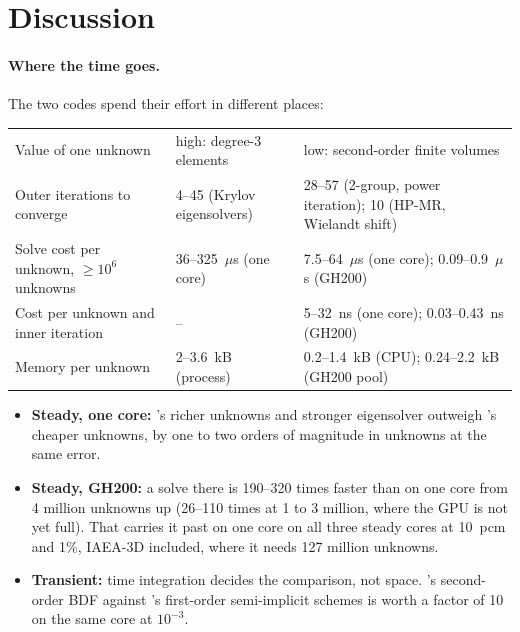 \section{Discussion}
\label{sec:discussion}

\paragraph{Where the time goes.} The two codes spend their effort in
different places:

\begin{center}\small
\begin{tabular}{p{4.0cm}p{5.0cm}p{5.9cm}}
\hline
 & \ffn{} & \garnet{} \\
\hline
Value of one unknown & high: degree-3 elements & low: second-order finite volumes \\
Outer iterations to converge & 4--45 (Krylov eigensolvers) & 28--57 (2-group, power iteration); 10 (HP-MR, Wielandt shift) \\
Solve cost per unknown, $\ge 10^6$ unknowns & 36--325~$\mu$s (one core) & 7.5--64~$\mu$s (one core); 0.09--0.9~$\mu$s (GH200) \\
Cost per unknown and inner iteration & -- & 5--32~ns (one core); 0.03--0.43~ns (GH200) \\
Memory per unknown & 2--3.6~kB (process) & 0.2--1.4~kB (CPU); 0.24--2.2~kB (GH200 pool) \\
\hline
\end{tabular}
\end{center}

\begin{itemize}
\item \textbf{Steady, one core:} \ffn's richer unknowns and stronger eigensolver
  outweigh \garnet's cheaper unknowns, by one to two orders of magnitude in
  unknowns at the same error.
\item \textbf{Steady, GH200:} a \garnet{} solve there is 190--320 times
  faster than on one core from 4 million unknowns up (26--110 times at 1 to
  3 million, where the GPU is not yet full). That carries it past \ffn{} on
  one core on all three steady cores at 10~pcm and 1\%, IAEA-3D included,
  where it needs 127 million unknowns.
\item \textbf{Transient:} time integration decides the comparison, not space.
  \garnet's second-order BDF against \ffn's first-order semi-implicit schemes is
  worth a factor of 10 on the same core at $10^{-3}$.
\end{itemize}


